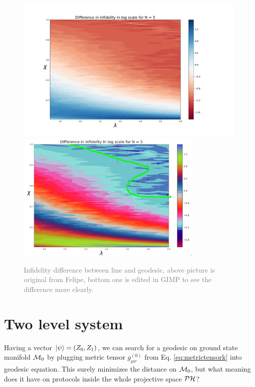 \begin{figure}[H]
    \centering
    \includegraphics[width=1\textwidth]{../img/fidelity_lineVSgeodesic.pdf}
    \includegraphics[width=0.8\textwidth]{../img/fidelity_geodesicVSline_fuckedupcolors.png}
    \caption{\textcolor{gray}{Infidelity difference between line and geodesic, above picture is original from Felipe, bottom one is edited in GIMP to see the difference more clearly.}}
    \label{fig:higherStateManifolds}    
\end{figure}





\chapter{Two level system}
Having a vector $\ket{\psi}=(Z_0,Z_1)$, we can search for a geodesic on ground state manifold $\mathcal{M}_0$ by plugging metric tensor $g^{(0)}_{\mu\nu}$ from Eq. \ref{eq:metrictensork} into geodesic equation. This surely minimizes the distance on $\mathcal{M}_0$, but what meaning does it have on protocols inside the whole projective space $\mathcal{PH}$? 


